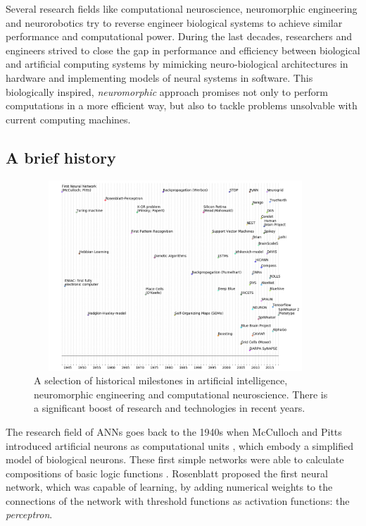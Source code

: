 Several research fields like computational neuroscience, neuromorphic engineering and neurorobotics try to reverse engineer biological systems to achieve similar performance and computational power.
During the last decades, researchers and engineers strived to close the gap in performance and efficiency between biological and artificial computing systems by mimicking neuro-biological architectures in hardware and implementing models of neural systems in software.
This biologically inspired, \textit{neuromorphic} approach promises not only to perform computations in a more efficient way, but also to tackle problems unsolvable with current computing machines.

\subsection{A brief history}
\begin{figure}[t!]
	\centering
	\includegraphics[width=0.95\textwidth,height=270px]{imgs/Neuromorphic_Timeline_beta.png}
	\caption{A selection of historical milestones in artificial intelligence, neuromorphic engineering and computational neuroscience. There is a significant boost of research and technologies in recent years.}
	\label{fig:neuro_time}
\end{figure}
The research field of \aclp{ANN} goes back to the 1940s when McCulloch and Pitts introduced artificial neurons as computational units \cite{McCulloch1943}, which embody a simplified model of biological neurons.
These first simple networks were able to calculate compositions of basic logic functions \cite{McCulloch1943, Rojas1996}.
Rosenblatt \cite{Rosenblatt58} proposed the first neural network, which was capable of learning, by adding numerical weights to the connections of the network with threshold functions as activation functions: the \textit{perceptron}.
